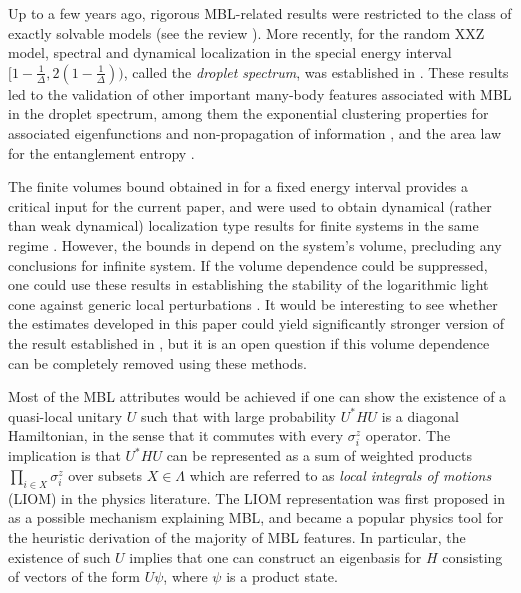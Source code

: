 \documentclass[12pt, a4paper,reqno]{amsart}
\numberwithin{equation}{section}
\newcommand{\pa}[1]{\left( #1 \right)}
\newcommand\La{\Lambda}
\newcommand{\tfd}{\pa{1- \tfrac{1}{\Delta}}}
\newcommand{\fd}{1- \frac{1}{\Delta}}
\begin{document}
 Up to a few years ago, rigorous MBL-related results  were  restricted to the class of exactly solvable models (see the review   \cite{ARNSS}). 
More recently,  for the random XXZ model, spectral and  dynamical localization in the  special energy interval $[\fd, 2\tfd)$,   called the {\it droplet spectrum},  was established in  \cite{BeW,EKS1}. These results led to the validation of other important many-body features associated with MBL in the droplet spectrum, among them the exponential clustering properties for associated eigenfunctions and non-propagation of information \cite{EKS3}, and the area law for the entanglement entropy \cite{BeW1}.

 The finite volumes bound obtained in \cite{EK22} for  a fixed energy interval provides a critical input  for the current paper,  and  were used to obtain   dynamical (rather than weak dynamical) localization type results for finite systems in the same regime \cite{EK24}.  However,  the bounds in \cite{EK24} depend on the system's volume, precluding any conclusions for infinite system.  If the volume dependence could be suppressed, one could use these results  in establishing the stability of the  logarithmic light cone against generic  local perturbations \cite{TB}.
 It would be interesting to see whether the estimates developed in this paper could yield significantly stronger version of the result established in \cite{EK24}, but it is an open question if this volume dependence can be completely removed using these methods. 




Most of the MBL attributes would be achieved if one can show the existence of  a  quasi-local unitary $U$ such that with large probability $U^*HU$ is a diagonal Hamiltonian, in the sense that it commutes with every $\sigma_i^z$ operator.  The implication is that $U^*HU$ can be represented as a sum of  weighted products $\prod_{i\in X}\sigma_i^z$  over subsets $X\in\La$ which are referred to as {\it local integrals of motions} (LIOM) in the physics literature. The LIOM representation  was first proposed in \cite{SPZA} as a possible mechanism explaining MBL, and became a popular physics  tool  for the heuristic derivation of  the majority of MBL features. In particular, the existence of such $U$  implies that one can construct an eigenbasis for $H$ consisting of vectors of the form $U\psi$, where $\psi$ is a product state.  
\end{document}
